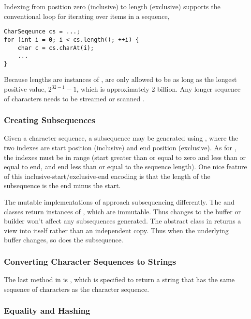 Indexing from position zero (inclusive) to length (exclusive) supports
the conventional  loop for iterating over items in a sequence,
%
\begin{verbatim}
CharSeqeunce cs = ...;
for (int i = 0; i < cs.length(); ++i) {
    char c = cs.charAt(i);
    ...
}
\end{verbatim}
%
Because lengths are instances of , are only allowed to be as
long as the longest positive  value, $2^{32-1} - 1$, which
is approximately 2 billion.  Any longer sequence of characters needs
to be streamed  or scanned
.

\subsubsection{Creating Subsequences}

Given a character sequence, a subsequence may be generated using
, where the two indexes are start position
(inclusive) and end position (exclusive).  As for , the
indexes must be in range (start greater than or equal to zero and less
than or equal to end, and end less than or equal to the sequence
length). One nice feature of this inclusive-start/exclusive-end
encoding is that the length of the subsequence is the end minus the
start.  

The mutable implementations of  approach
subsequencing differently.  The  and
 classes return instances of , which
are immutable.  Thus changes to the buffer or builder won't affect any
subsequences generated.  The  abstract class in
 returns a view into itself rather than an independent
copy.  Thus when the underlying buffer changes, so does the
subsequence.

\subsubsection{Converting Character Sequences to Strings}

The last method in  is , which is
specified to return a string that has the same sequence of characters
as the character sequence.  

\subsubsection{Equality and Hashing}

